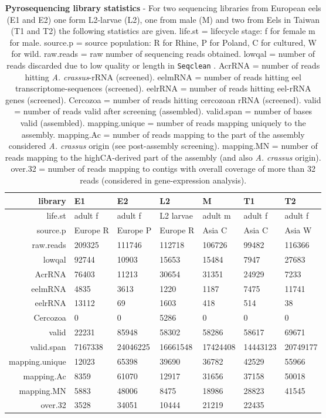 \begin{table}[!h]
\begin{tabular}{rllllll}
   \hline
library & E1 & E2 & L2 & M & T1 & T2 \\ 
   \hline
life.st & adult f & adult f & L2 larvae & adult m & adult f & adult f \\ 
  source.p & Europe R & Europe P & Europe R & Asia C & Asia C & Asia W \\ 
  raw.reads & 209325 & 111746 & 112718 & 106726 & 99482 & 116366 \\ 
  lowqal & 92744 & 10903 & 15653 & 15484 & 7947 & 27683 \\ 
  AcrRNA & 76403 & 11213 & 30654 & 31351 & 24929 & 7233 \\ 
  eelmRNA & 4835 & 3613 & 1220 & 1187 & 7475 & 11741 \\ 
  eelrRNA & 13112 & 69 & 1603 & 418 & 514 & 38 \\ 
  Cercozoa & 0 & 0 & 5286 & 0 & 0 & 0 \\ 
  valid & 22231 & 85948 & 58302 & 58286 & 58617 & 69671 \\ 
  valid.span & 7167338 & 24046225 & 16661548 & 17424408 & 14443123 & 20749177 \\ 
  mapping.unique & 12023 & 65398 & 39690 & 36782 & 42529 & 55966 \\ 
  mapping.Ac &  8359 & 61070 & 12917 & 31656 & 37158 & 50018 \\ 
  mapping.MN &  5883 & 48006 &  8475 & 18986 & 28823 & 41545 \\ 
  over.32 &  3528 & 34051 & 10444 & 21219 & 22435 \\ 
  \hline
\end{tabular}
\caption[Pyrosequencing library statistics]{
  \textbf{Pyrosequencing library statistics} - 
  For two sequencing libraries from European eels (E1 and E2)
  one form L2-larvae (L2), one from male (M) and two from Eels in Taiwan
  (T1 and T2) the following statistics are given. life.st = lifecycle
  stage: f for female m for male. source.p = source population: R for
  Rhine, P for Poland, C for cultured, W for wild. raw.reads = raw
  number of sequencing reads obtained. lowqal = number of reads
  discarded due to low quality or length in \texttt{Seqclean}
  \cite{tgicl_pertea}. AcrRNA = number of reads hitting
  \textit{A. crassus}-rRNA (screened). eelmRNA = number of reads hitting
  eel transcriptome-sequences (screened). eelrRNA = number of reads
  hitting eel-rRNA genes (screened). Cercozoa = number of reads hitting
  cercozoan rRNA (screened). valid = number of reads valid after
  screening (assembled). valid.span = number of bases valid (assembled).
  mapping.unique = number of reads mapping uniquely to the
  assembly. mapping.Ac = number of reads mapping to the part of the
  assembly considered \textit{A. crassus} origin (see post-assembly
  screening). mapping.MN = number of reads mapping to the highCA-derived
  part of the assembly (and also \textit{A. crassus} origin). over.32 =
  number of reads mapping to contigs with overall coverage of more than
  32 reads (considered in gene-expression analysis).}
  \label{screening-lib}
\end{table}

